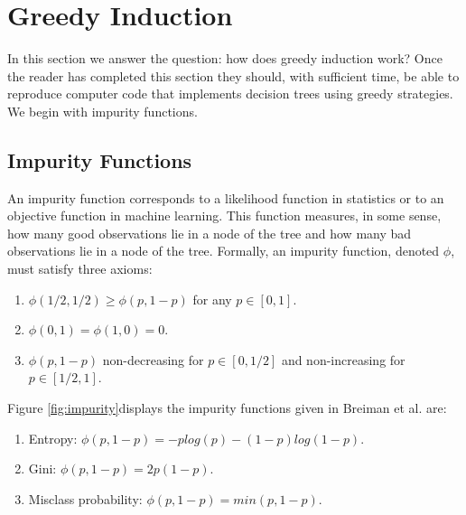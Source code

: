 \section{Greedy Induction}
\label{ch:p1sub_greedy_ind}

In this section we answer the question: how does greedy induction work? Once the reader has completed this section they should, with sufficient time, be able to reproduce computer code that implements decision trees using greedy strategies. We begin with impurity functions. 

\subsection{Impurity Functions}

An impurity function corresponds to a likelihood function in statistics or to an objective function in machine learning. This function measures, in some sense, how many good observations lie in a node of the tree and how many bad observations lie in a node of the tree. Formally, an impurity function, denoted $\phi$, must satisfy three axioms:

\begin{enumerate}
\item $\phi(1/2,1/2) \geq \phi(p, 1-p)$ for any $p\in[0,1]$. 
\item $\phi(0,1)=\phi(1,0)=0$. 
\item $ \phi(p, 1-p)$ non-decreasing for $p\in[0,1/2]$ and non-increasing for $p\in[1/2,1]$. 
\end{enumerate}

Figure \ref{fig:impurity}displays  the impurity functions given in Breiman et al. \cite{breiman1984classification} are: 
\begin{enumerate}
\item Entropy: $\phi(p,1-p)= -plog(p) -(1-p)log(1-p)$.
\item Gini: $\phi(p, 1-p)=2p(1-p)$.
\item Misclass probability: $\phi(p, 1-p)=min(p,1-p).$
\end{enumerate}

